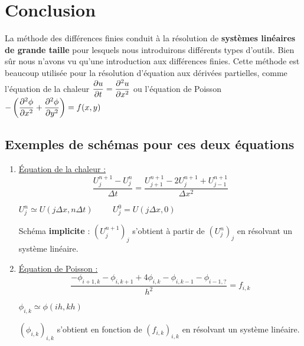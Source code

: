 \section{Conclusion}

La méthode des différences finies conduit à la résolution de
\textbf{systèmes linéaires de grande taille} pour lesquels nous introduirons
différents types d'outils. Bien sûr nous n'avons vu qu'une introduction
aux différences finies. Cette méthode est beaucoup utilisée pour la résolution
d'équation aux dérivées partielles, comme l'équation de la chaleur
${\displaystyle\frac{\partial u}{\partial t} = \displaystyle\frac{\partial^2u}{\partial x^2}}$ ou l'équation de Poisson 
${-\left( \displaystyle\frac{\partial^2 \phi}{\partial x^2} + \displaystyle\frac{\partial^2 \phi}{\partial y^2} \right) = f(x,y)}$

\subsection*{Exemples de schémas pour ces deux équations}

\begin{enumerate}[label=•]
    \item \underline{Équation de la chaleur :}
        \[
            \frac{U_j^{n+1}- U_j^n}{\Delta t} = \frac{U_{j+1}^{n+1} - 2 U_j^{n+1} + U_{j-1}^{n+1}}{\Delta x^2}
        \]

        $U_j^n \simeq U(j\Delta x, n\Delta t) \hspace{1cm} U_j^0 = U(j \Delta x,0)$

        Schéma \textbf{implicite} : $(U_j^{n+1})_j$ s'obtient à partir de $(U_j^n)_j$
        en résolvant un système linéaire.

    \item \underline{Équation de Poisson :}
        \[
            \frac{- \phi_{i+1,k} - \phi_{i,k+1} + 4 \phi_{i,k} - \phi_{i,k-1} - \phi_{i-1,?}}{h^2} = f_{i,k}
        \]

        $\phi_{i,k} \simeq \phi(ih,kh)$

        $(\phi_{i,k})_{i,k}$ s'obtient en fonction de $(f_{i,k})_{i,k}$ en
        résolvant un système linéaire.
\end{enumerate}
